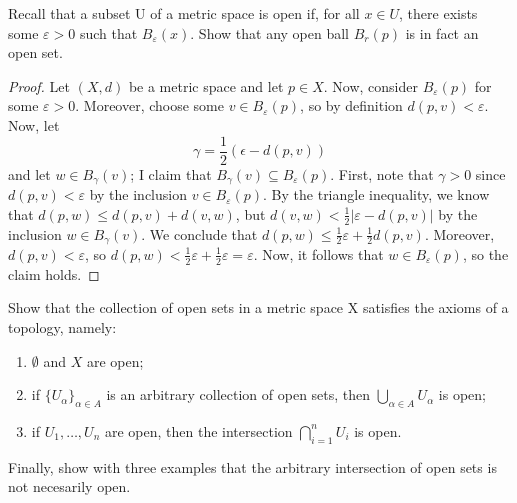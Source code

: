 \documentclass[./main.tex]{subfiles}
\begin{document}
\begin{fprob}
    Recall that a subset U of a metric space is open if, for all $x\in U$, there exists some
    $\varepsilon >0$ such that $B_{\varepsilon}(x)$. Show that any open ball $B_r(p)$ is in fact an open set.
\end{fprob}
\begin{proof}
    Let $(X,d)$ be a metric space and let $p\in X$. Now, consider $B_\varepsilon(p)$ for some $\varepsilon>0$.
    Moreover, choose some $v\in B_\varepsilon(p)$, so by definition $d(p,v)<\varepsilon$. Now, let
    \[
        \gamma = \frac{1}{2}(\epsilon-d(p,v))
    \]
    and let $w\in B_\gamma(v)$; I claim that $B_\gamma(v)\subseteq B_\varepsilon(p)$. First, note that $\gamma>0$ since 
    $d(p,v)<\varepsilon$ by the inclusion $v\in B_\varepsilon(p)$. By the triangle inequality, we know that 
    $d(p,w)\leq d(p,v)+d(v,w)$, but $d(v,w)<\frac{1}{2}|\varepsilon-d(p,v)|$ by the inclusion $w\in B_\gamma(v)$. 
    We conclude that $d(p,w)\leq \frac{1}{2}\varepsilon+\frac{1}{2}d(p,v)$. Moreover, $d(p,v)<\varepsilon$, so 
    $d(p,w)<\frac{1}{2}\varepsilon+\frac{1}{2}\varepsilon=\varepsilon$. Now, it follows that $w\in B_\varepsilon(p)$, so the claim holds. 
\end{proof}

\begin{fprob}
    Show that the collection of open sets in a metric space X satisfies the axioms of a topology, namely:
    \begin{enumerate}
        \item $\emptyset$ and $X$ are open;
        \item if $\{U_\alpha\}_{\alpha\in A}$ is an arbitrary collection of open sets, 
        then $\bigcup_{\alpha\in A}U_\alpha$ is open;
        \item if $U_1, \dots, U_n$ are open, then the intersection $\bigcap_{i=1}^nU_i$ is open.
    \end{enumerate}
    Finally, show with three examples that the arbitrary intersection of open sets is not necesarily open.
\end{fprob}
\end{document}
